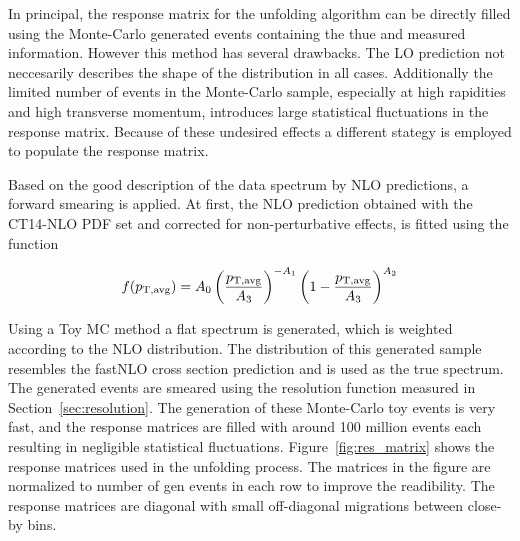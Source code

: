 In principal, the response matrix for the unfolding algorithm can be directly
filled using the Monte-Carlo generated events containing the thue and measured
information. However this method has several drawbacks. The LO prediction not
neccesarily describes the shape of the distribution in all cases. Additionally
the limited number of events in the Monte-Carlo sample, especially at high
rapidities and high transverse momentum, introduces large statistical
fluctuations in the response matrix. Because of these undesired effects a
different stategy is employed to populate the response matrix.

Based on the good description of the data spectrum by NLO predictions, a forward
smearing is applied. At first, the NLO prediction obtained with the CT14-NLO PDF
set and corrected for non-perturbative effects, is fitted using the function

\begin{equation}
    f(p_{\mathrm{T,avg}}) = A_0 \left(
    \frac{p_{\mathrm{T,avg}}}{A_3}\right)^{-A_1}\left(1-\frac{p_{\mathrm{T,avg}}}{A_3}\right)^{A_2}
\end{equation}

Using a Toy MC method a flat \ptavg spectrum is generated, which is weighted
according to the NLO distribution. The distribution of this generated sample
resembles the fastNLO cross section prediction and is used as the true \ptavg
spectrum. The generated events are smeared using the resolution function
measured in Section~\ref{sec:resolution}. The generation of these Monte-Carlo
toy events is very fast, and the response matrices are filled with around 100
million events each resulting in negligible statistical fluctuations.
Figure~\ref{fig:res_matrix} shows the response matrices used in the unfolding
process. The matrices in the figure are normalized to number of gen events in
each row to improve the readibility. The response matrices are diagonal with
small off-diagonal migrations between close-by \ptavg bins.

